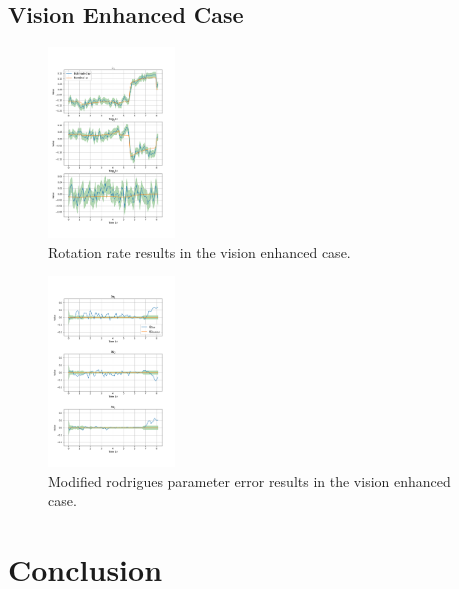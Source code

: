\documentclass[conference]{IEEEtran}
\begin{document}
\subsection{Vision Enhanced Case}


\begin{figure}[ht!] 
    \centerline{\includegraphics[width=0.3\textwidth]{omega_result_plot_vision_enhanced.png}}
    \caption{Rotation rate results in the vision enhanced case.}
    \label{fig:results_novision}
\end{figure}

\begin{figure}[ht!] 
    \centerline{\includegraphics[width=0.3\textwidth]{mrp_result_plot_vision_enhanced.png}}
    \caption{Modified rodrigues parameter error results in the vision enhanced case.}
    \label{fig:results_novision}
\end{figure}



\section{Conclusion}
\end{document}
